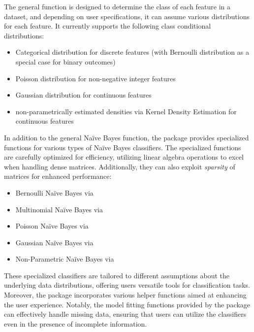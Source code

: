 \documentclass{article}\usepackage[]{graphicx}\usepackage[]{xcolor}
\begin{document}
The general \textcolor{darkgreen}{{}} function is designed to determine the class of each feature in a dataset, and depending on user specifications, it can assume various distributions for each feature. It currently supports the following class conditional distributions:

\begin{itemize}
  \item Categorical distribution for discrete features (with Bernoulli distribution as a special case for binary outcomes)
  \item Poisson distribution for non-negative integer features
  \item Gaussian distribution for continuous features
  \item non-parametrically estimated densities via Kernel Density Estimation for continuous features
\end{itemize}

In addition to the general Na\"ive Bayes function, the package provides specialized functions for various types of Na\"ive Bayes classifiers. The specialized functions are carefully optimized for efficiency, utilizing linear algebra operations to excel when handling dense matrices. Additionally, they can also exploit \emph{sparsity} of matrices for enhanced performance:

\begin{itemize}
 \item Bernoulli Na\"ive Bayes via \textcolor{darkgreen}{{}}
 \item Multinomial Na\"ive Bayes via \textcolor{darkgreen}{{}}
 \item Poisson Na\"ive Bayes via \textcolor{darkgreen}{{}}
 \item Gaussian Na\"ive Bayes via \textcolor{darkgreen}{{}}
 \item Non-Parametric Na\"ive Bayes via \textcolor{darkgreen}{{}}
\end{itemize}

These specialized classifiers are tailored to different assumptions about the underlying data distributions, offering users versatile tools for classification tasks. Moreover, the package incorporates various helper functions aimed at enhancing the user experience. Notably, the model fitting functions provided by the package can effectively handle missing data, ensuring that users can utilize the classifiers even in the presence of incomplete information.
\end{document}
